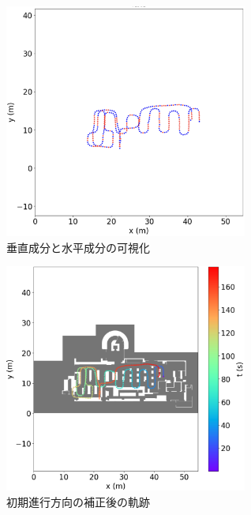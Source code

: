 \begin{figure}[ht]
	\centering
	\includegraphics[width=80mm]{image/rb.jpg}
	\caption{垂直成分と水平成分の可視化}    \label{fig:color}
\end{figure}

\begin{figure}[ht]
	\centering
	\includegraphics[width=80mm]{image/pdr-rotate.jpg}
	\caption{初期進行方向の補正後の軌跡}    \label{fig:pdr-rotate}
\end{figure}
